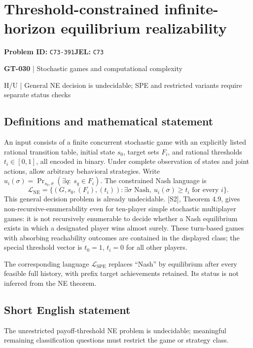\documentclass[11pt,a4paper]{article}
\begin{document}
\section*{Threshold-constrained infinite-horizon equilibrium realizability}
\textbf{Problem ID:} \texttt{C73-391}\quad \textbf{JEL:} \texttt{C73}\par
\label{problem:OP-0160}
\label{game:GT-030}
{\sffamily\small\color{muted}
{\sffamily\small\color{muted}\textbf{GT-030} | Stochastic games and computational complexity\par H/U | General NE decision is undecidable; SPE and restricted variants require separate status checks\par}
\par}
\subsection*{Definitions and mathematical statement}
An input consists of a finite concurrent stochastic game with an explicitly listed rational transition table, initial state $s_0$, target sets $F_i$, and rational thresholds $t_i\in[0,1]$, all encoded in binary. Under complete observation of states and joint actions, allow arbitrary behavioral strategies. Write $u_i(\sigma)=\Pr_{s_0,\sigma}(\exists q:\ s_q\in F_i)$. The constrained Nash language is
\[
 \mathcal L_{\mathrm{NE}}=
 \{(G,s_0,(F_i),(t_i)):\exists\sigma\text{ Nash},\ 
 u_i(\sigma)\geq t_i\text{ for every }i\}.
\]
This general decision problem is already undecidable. [S2], Theorem 4.9, gives non-recursive-enumerability even for ten-player simple stochastic multiplayer games: it is not recursively enumerable to decide whether a Nash equilibrium exists in which a designated player wins almost surely. These turn-based games with absorbing reachability outcomes are contained in the displayed class; the special threshold vector is $t_0=1$, $t_i=0$ for all other players.

The corresponding language $\mathcal L_{\mathrm{SPE}}$ replaces ``Nash'' by equilibrium after every feasible full history, with prefix target achievements retained. Its status is not inferred from the NE theorem.
\subsection*{Short English statement}
The unrestricted payoff-threshold NE problem is undecidable; meaningful remaining classification questions must restrict the game or strategy class.
\end{document}

